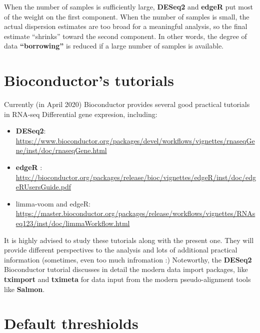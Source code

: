 \documentclass[]{book}
\providecommand{\tightlist}{%
  \setlength{\itemsep}{0pt}\setlength{\parskip}{0pt}}
\begin{document}
When the number of samples is sufficiently large, \textbf{DESeq2} and
\textbf{edgeR} put most of the weight on the first component. When the
number of samples is small, the actual dispersion estimates are too
broad for a meaningful analysis, so the final estimate ``shrinks''
toward the second component. In other words, the degree of data
\textbf{``borrowing''} is reduced if a large number of samples is
available.

\section{Bioconductor's tutorials}\label{bioconductors-tutorials}

Currently (in April 2020) Bioconductor provides several good practical
tutorials in RNA-seq Differential gene expresion, including:

\begin{itemize}
\tightlist
\item
  \textbf{DESeq2}:
  \url{https://www.bioconductor.org/packages/devel/workflows/vignettes/rnaseqGene/inst/doc/rnaseqGene.html}\\
\item
  \textbf{edgeR} :
  \url{http://bioconductor.org/packages/release/bioc/vignettes/edgeR/inst/doc/edgeRUsersGuide.pdf}\\
\item
  limma-voom and edgeR:
  \url{https://master.bioconductor.org/packages/release/workflows/vignettes/RNAseq123/inst/doc/limmaWorkflow.html}
\end{itemize}

It is highly advised to study these tutorials along with the present
one. They will provide different perspectives to the analysis and lots
of additional practical information (sometimes, even too much
infromation :) Noteworthy, the \textbf{DESeq2} Bioconductor tutorial
discusses in detail the modern data import packages, like
\textbf{tximport} and \textbf{tximeta} for data input from the modern
pseudo-alignment tools like \textbf{Salmon}.

\section{Default threshiolds}\label{default-threshiolds}
\end{document}
